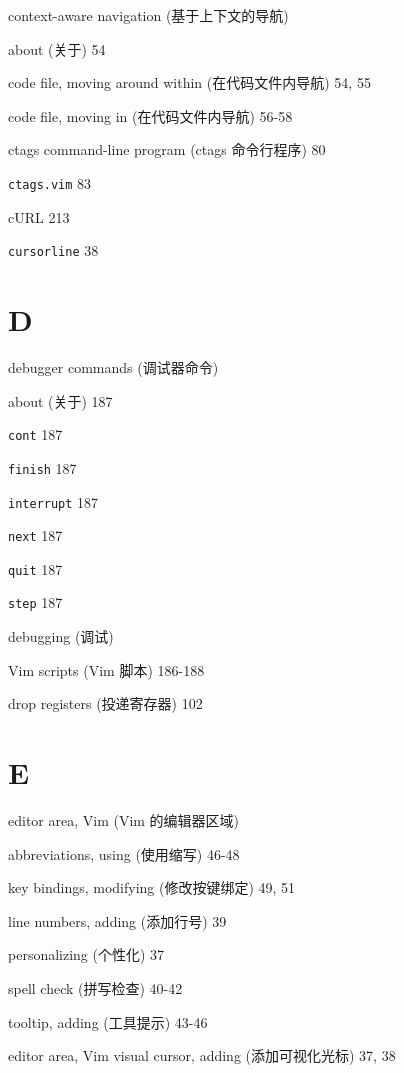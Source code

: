 \begin{multicols}{2}
context-aware navigation (基于上下文的导航) \par
  about (关于) 54 \par
  code file, moving around within (在代码文件内导航) 54, 55 \par
  code file, moving in (在代码文件内导航) 56-58 \par

ctags command-line program (ctags 命令行程序) 80

\texttt{ctags.vim} 83

cURL 213

\texttt{cursorline} 38

\section*{D}

debugger commands (调试器命令) \par
  about (关于) 187 \par
  \texttt{cont} 187 \par
  \texttt{finish} 187 \par
  \texttt{interrupt} 187 \par
  \texttt{next} 187 \par
  \texttt{quit} 187 \par
  \texttt{step} 187 \par

debugging (调试) \par
  Vim scripts (Vim 脚本) 186-188 \par

drop registers (投递寄存器) 102

\section*{E}

editor area, Vim (Vim 的编辑器区域) \par
  abbreviations, using (使用缩写) 46-48 \par
  key bindings, modifying (修改按键绑定) 49, 51 \par
  line numbers, adding (添加行号) 39 \par
  personalizing (个性化) 37 \par
  spell check (拼写检查) 40-42 \par
  tooltip, adding (工具提示) 43-46 \par
  editor area, Vim visual cursor, adding (添加可视化光标) 37, 38 \par


\end{multicols}
